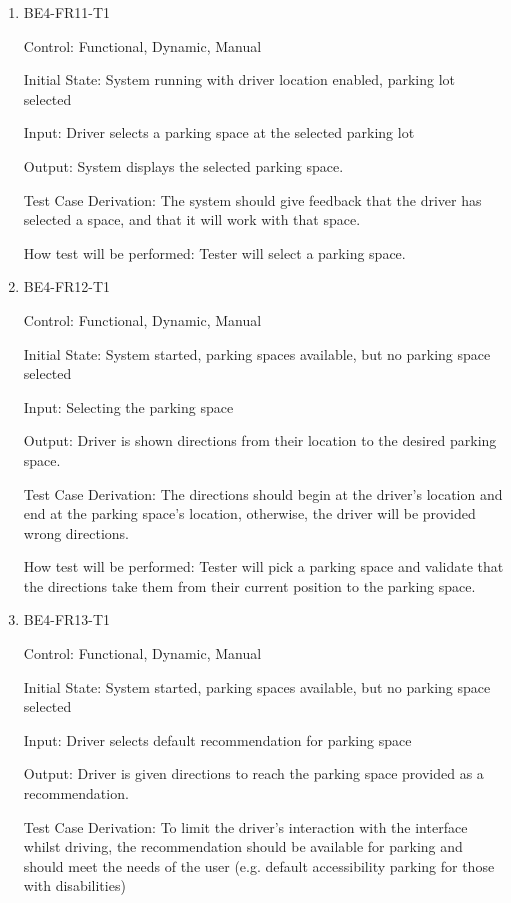 \documentclass[12pt, titlepage]{article}
\begin{document}
\begin{enumerate}

\item{BE4-FR11-T1}

Control: Functional, Dynamic, Manual
					
Initial State: System running with driver location enabled, parking lot selected
					
Input: Driver selects a parking space at the selected parking lot
					
Output: System displays the selected parking space.

Test Case Derivation: The system should give feedback that the driver has
selected a space, and that it will work with that space.
					
How test will be performed: Tester will select a parking space.

\item{BE4-FR12-T1}

Control: Functional, Dynamic, Manual
					
Initial State: System started, parking spaces available, but no parking space
selected
					
Input: Selecting the parking space
					
Output: Driver is shown directions from their location to the desired parking
space.

Test Case Derivation: The directions should begin at the driver's location and
end at the parking space's location, otherwise, the driver will be provided
wrong directions.
					
How test will be performed: Tester will pick a parking space and validate that
the directions take them from their current position to the parking space.

\item{BE4-FR13-T1}

Control: Functional, Dynamic, Manual
					
Initial State: System started, parking spaces available, but no parking space
selected
					
Input: Driver selects default recommendation for parking space
					
Output: Driver is given directions to reach the parking space provided as a
recommendation.

Test Case Derivation: To limit the driver's interaction with the interface
whilst driving, the recommendation should be available for parking and should
meet the needs of the user (e.g. default accessibility parking for those with
disabilities)
					

\end{enumerate}
\end{document}
